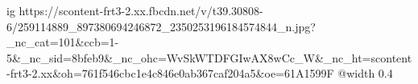  
 
 
 
 

\ifcmt
  ig https://scontent-frt3-2.xx.fbcdn.net/v/t39.30808-6/259114889_897380694246872_2350253196184574844_n.jpg?_nc_cat=101&ccb=1-5&_nc_sid=8bfeb9&_nc_ohc=WvSkWTDFGIwAX8wCc_W&_nc_ht=scontent-frt3-2.xx&oh=761f546cbc1e4c846e0ab367caf204a5&oe=61A1599F
  @width 0.4
\fi
